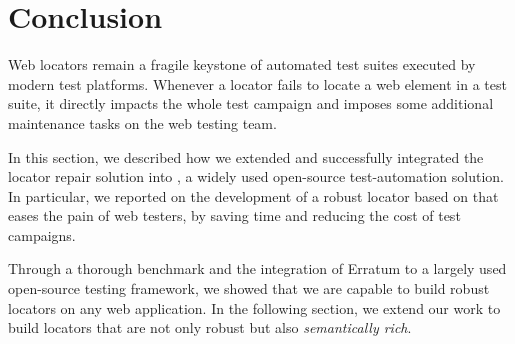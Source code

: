 \section{Conclusion}\label{cerberus:sec:conclusion}
Web locators remain a fragile keystone of automated test suites executed by modern test platforms.
Whenever a locator fails to locate a web element in a test suite, it directly impacts the whole test campaign and imposes some additional maintenance tasks on the web testing team.

In this section, we described how we extended and successfully integrated the locator repair solution \erratum into \cerberus, a widely used open-source test-automation solution.
In particular, we reported on the development of a robust locator based on \erratum that eases the pain of web testers, by saving time and reducing the cost of test campaigns.

Through a thorough benchmark and the integration of Erratum to a largely used open-source testing framework, we showed that we are capable to build robust locators on any web application.
In the following section, we extend our work to build locators that are not only robust but also \textit{semantically rich}.
